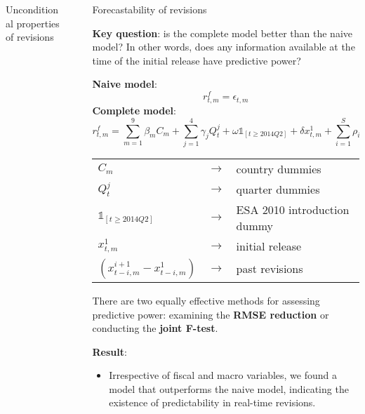 \documentclass[final]{beamer}
\newlength{\sepwidth}
\newlength{\colwidth}
\newcommand{\separatorcolumn}{\begin{column}{\sepwidth}\end{column}}
\begin{document}
\begin{frame}[t]
\begin{columns}[t]
\begin{column}{\colwidth}
  \begin{block}{Unconditional properties of revisions}

  \end{block}

\end{column}
\separatorcolumn


\begin{column}{\colwidth}



  \begin{block}{Forecastability of revisions}

    \textbf{Key question}: is the complete model better than the naive model? In other words, does any information available at the time of the initial release have predictive power?

    \textbf{Naive model}: 
    \[
    r_{t,m}^{f} = \epsilon_{t,m}
    \]
    \textbf{Complete model}: 
    \[
      r_{t,m}^{f} = \sum_{m=1}^{9}\beta_{m}C_{m} 
    + \sum_{j=1}^{4} \gamma_{j}Q_{t}^{j} 
    + \omega\mathds{1}_{\left[t\geq2014Q2\right]}
    + \delta x_{t,m}^{1} 
    + \sum_{i=1}^{S} \rho_{i}\left(x_{t-i,m}^{i+1}-x_{t-i,m}^{1}\right)
    + \epsilon_{t,m}
    \]

    \begin{tabular}{lll}
         $C_{m}$ & $\rightarrow$ & country dummies \\
         $Q_{t}^{j}$ & $\rightarrow$ & quarter dummies \\
         $\mathds{1}_{\left[t\geq2014Q2\right]}$ & $\rightarrow$ & ESA 2010 introduction dummy \\
         $x_{t,m}^{1}$ & $\rightarrow$ & initial release \\
         $\left(x_{t-i,m}^{i+1}-x_{t-i,m}^{1}\right)$ & $\rightarrow$ & past revisions \\
      \end{tabular}

    \vspace*{0.5cm}

    There are two equally effective methods for assessing predictive power: examining the \textbf{RMSE reduction} or conducting the \textbf{joint F-test}.

    \vspace*{0.5cm}
    \textbf{Result}:
    \begin{itemize}
      \item Irrespective of fiscal and macro variables, we found a model that outperforms the naive model, indicating the existence of predictability in real-time revisions.
    \end{itemize} 


\end{block}
\end{column}
\end{columns}
\end{frame}
\end{document}
